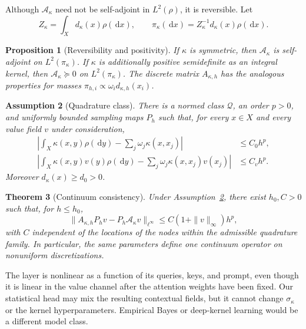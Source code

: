 \documentclass[11pt,a4paper]{article}
\numberwithin{equation}{section}
\newtheorem{theorem}{Theorem}[section]
\newtheorem{proposition}[theorem]{Proposition}
\newtheorem{assumption}[theorem]{Assumption}
\theoremstyle{definition}
\theoremstyle{remark}
\newcommand{\calA}{\mathcal A}
\newcommand{\dd}{\,\mathrm d}
\begin{document}
Although $\calA_\kappa$ need not be self-adjoint in $L^2(\rho)$, it is
reversible.  Let
\begin{equation}
 Z_\kappa=\int_Xd_\kappa(x)\rho(\dd x),\qquad
 \pi_\kappa(\dd x)=Z_\kappa^{-1}d_\kappa(x)\rho(\dd x).
 \label{eq:stationary-measure}
\end{equation}

\begin{proposition}[Reversibility and positivity]
\label{prop:reversibility}
If $\kappa$ is symmetric, then $\calA_\kappa$ is self-adjoint on
$L^2(\pi_\kappa)$.  If $\kappa$ is additionally positive semidefinite as an
integral kernel, then $\calA_\kappa\succeq0$ on $L^2(\pi_\kappa)$.
The discrete matrix $A_{\kappa,h}$ has the analogous properties for masses
$\pi_{h,i}\propto\omega_i d_{\kappa,h}(x_i)$.
\end{proposition}

\begin{assumption}[Quadrature class]
\label{ass:quadrature}
There is a normed class $\mathcal Q$, an order $p>0$, and uniformly bounded
sampling maps $P_h$ such that, for every $x\in X$ and every value field $v$
under consideration,
\begin{align}
 \left|\int_X\kappa(x,y)\rho(\dd y)
       -\sum_j\omega_j\kappa(x,x_j)\right|&\le C_0h^p,\nonumber\\
 \left|\int_X\kappa(x,y)v(y)\rho(\dd y)
       -\sum_j\omega_j\kappa(x,x_j)v(x_j)\right|&\le C_vh^p.
 \label{eq:quadrature-assumption}
\end{align}
Moreover $d_\kappa(x)\ge d_0>0$.
\end{assumption}

\begin{theorem}[Continuum consistency]
\label{thm:continuum-consistency}
Under Assumption~\ref{ass:quadrature}, there exist \(h_0,C>0\) such that,
for \(h\le h_0\),
\begin{equation}
 \|A_{\kappa,h}P_hv-P_h\calA_\kappa v\|_{\ell^\infty}
 \le C(1+\|v\|_\infty)h^p,
 \label{eq:attention-consistency}
\end{equation}
with $C$ independent of the locations of the nodes within the admissible
quadrature family.  In particular, the same parameters define one continuum
operator on nonuniform discretizations.
\end{theorem}

The layer is nonlinear as a function of its queries, keys, and prompt, even
though it is linear in the value channel after the attention weights have
been fixed.  Our statistical head may mix the resulting contextual fields,
but it cannot change $\sigma_\kappa$ or the kernel hyperparameters.  Empirical
Bayes or deep-kernel learning would be a different model class.
\end{document}
